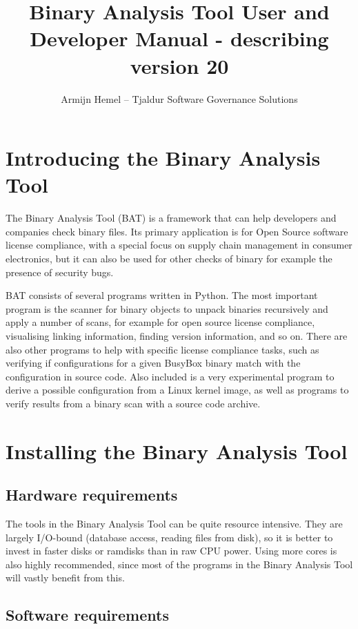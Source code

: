 \documentclass[10pt]{article}
\author{Armijn Hemel -- Tjaldur Software Governance Solutions}
\title{Binary Analysis Tool User and Developer Manual - describing version 20}
\begin{document}
\maketitle
\thispagestyle{empty}

\tableofcontents

\section{Introducing the Binary Analysis Tool}

The Binary Analysis Tool (BAT) is a framework that can help developers and
companies check binary files. Its primary application is for Open Source
software license compliance, with a special focus on supply chain management
in consumer electronics, but it can also be used for other checks of binary
for example the presence of security bugs.

BAT consists of several programs written in Python. The most important program
is the scanner for binary objects to unpack binaries recursively and apply a
number of scans, for example for open source license compliance, visualising
linking information, finding version information, and so on.  There are also
other programs to help with specific license compliance tasks, such as
verifying if configurations for a given BusyBox binary match with the
configuration in source code. Also included is a very experimental program to
derive a possible configuration from a Linux kernel image, as well as programs
to verify results from a binary scan with a source code archive.

\section{Installing the Binary Analysis Tool}

\subsection{Hardware requirements}

The tools in the Binary Analysis Tool can be quite resource intensive. They
are largely I/O-bound (database access, reading files from disk), so it is
better to invest in faster disks or ramdisks than in raw CPU power. Using more
cores is also highly recommended, since most of the programs in the Binary
Analysis Tool will vastly benefit from this.

\subsection{Software requirements}
\end{document}
